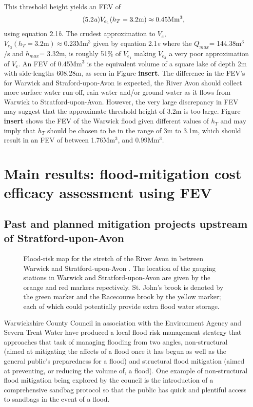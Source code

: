 \documentclass[11pt,a4paper]{article}
\begin{document}
This threshold height yields an FEV of
\begin{equation}\tag{5.2\textit{a}}
V_{e_1}(h_T=\text{3.2m})\approx 0.45\text{Mm$^3$},
\end{equation}
using equation 2.1\textit{b}. The crudest approximation to $V_e$, $V_{e_3}(h_T=\text{3.2m})\approx 0.23\text{Mm$^3$}$ given by equation 2.1\textit{e} where the $Q_{max}$= 144.38m$^3$/s and $h_{max}$= 3.32m, is roughly 51\% of $V_{e_1}$ making $V_{e_3}$ a very poor approximation of $V_e$. An FEV of 0.45Mm$^3$ is the equivalent volume of a square lake of depth 2m with side-lengths 608.28m, as seen in Figure \textbf{insert}. The difference in the FEV's for Warwick and Straford-upon-Avon is expected, the River Avon should collect more surface water run-off, rain water and/or ground water as it flows from Warwick to Stratford-upon-Avon. However, the very large discrepancy in FEV may suggest that the approximate threshold height of 3.2m is too large. Figure \textbf{insert} shows the FEV of the Warwick flood given different values of $h_T$ and may imply that $h_T$ should be chosen to be in the range of 3m to 3.1m, which should result in an FEV of between 1.76Mm$^3$, and 0.99Mm$^3$.

\section{Main results: flood-mitigation cost efficacy assessment using FEV}
\subsection{Past and planned mitigation projects upstream of Stratford-upon-Avon}
\begin{figure}[ht!]
\begin{center}
\caption{Flood-risk map for the stretch of the River Avon in between Warwick and Stratford-upon-Avon \cite{flood-risk}. The location of the gauging stations in Warwick and Stratford-upon-Avon are given by the orange and red markers repectively. St. John's brook is denoted by the green marker and the Racecourse brook by the yellow marker{;} each of which could potentially provide extra flood water storage.}
\end{center}
\end{figure}

Warwickshire County Council in association with the Environment Agency and Severn Trent Water have produced a local flood risk management strategy \cite{war1} that approaches that task of managing flooding from two angles, non-structural (aimed at mitigating the affects of a flood once it has begun as well as the general public's preparedness for a flood) and structural flood mitigation (aimed at preventing, or reducing the volume of, a flood). One example of non-structural flood mitigation being explored by the council is the introduction of a comprehensive sandbag protocol so that the public has quick and plentiful access to sandbags in the event of a flood. 
\end{document}

